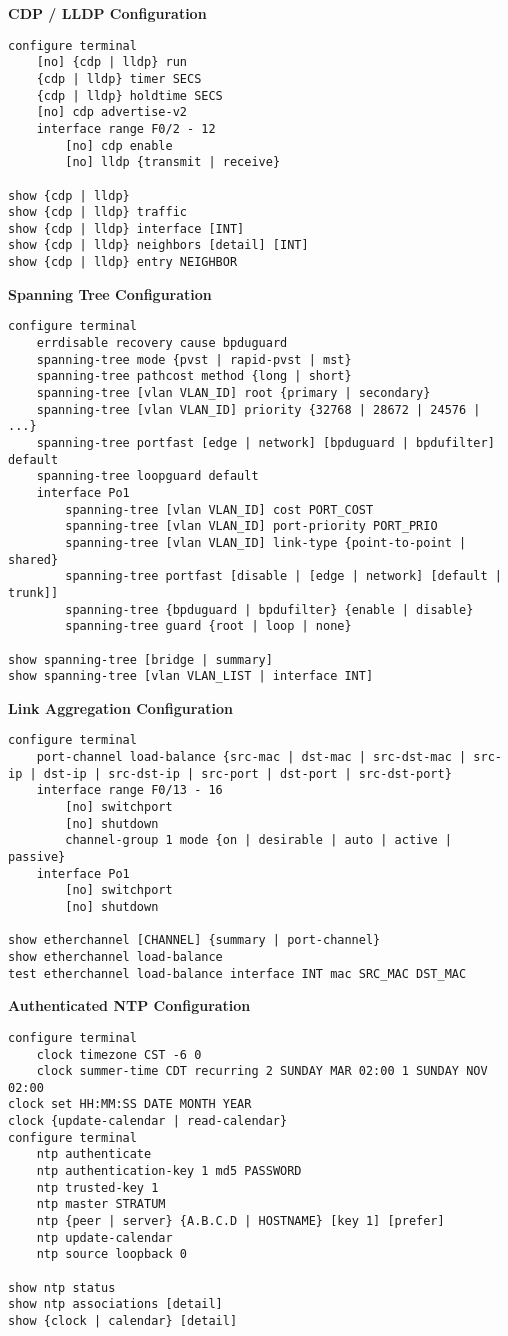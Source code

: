 \documentclass[12pt]{article}
\begin{document}
	\textbf{CDP / LLDP Configuration}
	\begin{lstlisting}
configure terminal
	[no] {cdp | lldp} run
	{cdp | lldp} timer SECS
	{cdp | lldp} holdtime SECS
	[no] cdp advertise-v2
	interface range F0/2 - 12
		[no] cdp enable
		[no] lldp {transmit | receive}

show {cdp | lldp}
show {cdp | lldp} traffic
show {cdp | lldp} interface [INT]
show {cdp | lldp} neighbors [detail] [INT]
show {cdp | lldp} entry NEIGHBOR
	\end{lstlisting}

	\textbf{Spanning Tree Configuration}
	\begin{lstlisting}
configure terminal
	errdisable recovery cause bpduguard
	spanning-tree mode {pvst | rapid-pvst | mst}
	spanning-tree pathcost method {long | short}
	spanning-tree [vlan VLAN_ID] root {primary | secondary}
	spanning-tree [vlan VLAN_ID] priority {32768 | 28672 | 24576 | ...}
	spanning-tree portfast [edge | network] [bpduguard | bpdufilter] default
	spanning-tree loopguard default
	interface Po1
		spanning-tree [vlan VLAN_ID] cost PORT_COST
		spanning-tree [vlan VLAN_ID] port-priority PORT_PRIO
		spanning-tree [vlan VLAN_ID] link-type {point-to-point | shared}
		spanning-tree portfast [disable | [edge | network] [default | trunk]]
		spanning-tree {bpduguard | bpdufilter} {enable | disable}
		spanning-tree guard {root | loop | none}

show spanning-tree [bridge | summary]
show spanning-tree [vlan VLAN_LIST | interface INT]
	\end{lstlisting}

	\textbf{Link Aggregation Configuration}
	\begin{lstlisting}
configure terminal
	port-channel load-balance {src-mac | dst-mac | src-dst-mac | src-ip | dst-ip | src-dst-ip | src-port | dst-port | src-dst-port}
	interface range F0/13 - 16
		[no] switchport
		[no] shutdown
		channel-group 1 mode {on | desirable | auto | active | passive}
	interface Po1
		[no] switchport
		[no] shutdown

show etherchannel [CHANNEL] {summary | port-channel}
show etherchannel load-balance
test etherchannel load-balance interface INT mac SRC_MAC DST_MAC
	\end{lstlisting}

	\textbf{Authenticated NTP Configuration}
	\begin{lstlisting}
configure terminal
	clock timezone CST -6 0
	clock summer-time CDT recurring 2 SUNDAY MAR 02:00 1 SUNDAY NOV 02:00
clock set HH:MM:SS DATE MONTH YEAR
clock {update-calendar | read-calendar}
configure terminal
	ntp authenticate
	ntp authentication-key 1 md5 PASSWORD
	ntp trusted-key 1
	ntp master STRATUM
	ntp {peer | server} {A.B.C.D | HOSTNAME} [key 1] [prefer]
	ntp update-calendar
	ntp source loopback 0

show ntp status
show ntp associations [detail]
show {clock | calendar} [detail]
	\end{lstlisting}
\end{document}
